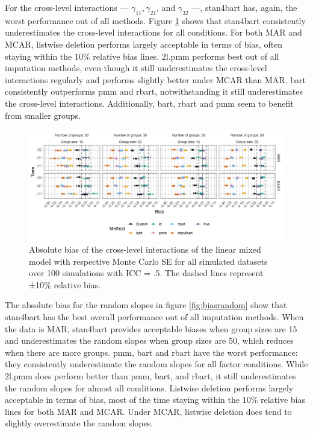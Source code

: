 \documentclass[10pt, a4paper, titlepage]{article}
\begin{document}
For the cross-level interactions --- $\gamma_{11}, \gamma_{21}$, and $\gamma_{32}$ ---, stan4bart has, again, the worst performance out of all methods. Figure \ref{fig:biascrosslevel} shows that stan4bart consistently underestimates the cross-level interactions for all conditions. For both MAR and MCAR, listwise deletion performs largely acceptable in terms of bias, often staying within the 10\% relative bias lines. 2l.pmm performs best out of all imputation methods, even though it still underestimates the cross-level interactions regularly and performs slightly better under MCAR than MAR. bart consistently outperforms pmm and rbart, notwithstanding it still underestimates the cross-level interactions. Additionally, bart, rbart and pmm seem to benefit from smaller groups. 

\begin{figure}[H]
    \centering
    \includegraphics[width=1\textwidth]{biascrosslevel.png}
    \caption{Absolute bias of the cross-level interactions of the linear mixed model with respective Monte Carlo SE for all simulated datasets over 100 simulations with ICC = .5. The dashed lines represent ±10\% relative bias.}
    \label{fig:biascrosslevel}
\end{figure}

The absolute bias for the random slopes in figure \ref{fig:biasrandom} show that stan4bart has the best overall performance out of all imputation methods. When the data is MAR, stan4bart provides acceptable biases when group sizes are 15 and underestimates the random slopes when group sizes are 50, which reduces when there are more groups. pmm, bart and rbart have the worst performance: they consistently underestimate the random slopes for all factor conditions. While 2l.pmm does perform better than pmm, bart, and rbart, it still underestimates the random slopes for almost all conditions. Listwise deletion performs largely acceptable in terms of bias, most of the time staying within the 10\% relative bias lines for both MAR and MCAR. Under MCAR, listwise deletion does tend to slightly overestimate the random slopes.
\end{document}

